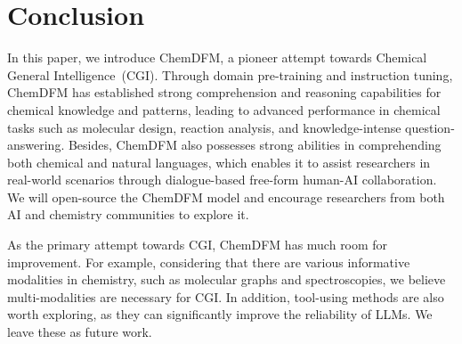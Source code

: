 \section{Conclusion}

In this paper, we introduce ChemDFM, a pioneer attempt towards Chemical General Intelligence~(CGI). Through domain pre-training and instruction tuning, ChemDFM has established strong comprehension and reasoning capabilities for chemical knowledge and patterns, leading to advanced performance in chemical tasks such as molecular design, reaction analysis, and knowledge-intense question-answering. Besides, ChemDFM also possesses strong abilities in comprehending both chemical and natural languages, which enables it to assist researchers in real-world scenarios through dialogue-based free-form human-AI collaboration. We will open-source the ChemDFM model and encourage researchers from both AI and chemistry communities to explore it.

As the primary attempt towards CGI, ChemDFM has much room for improvement. For example, considering that there are various informative modalities in chemistry, such as molecular graphs and spectroscopies, we believe multi-modalities are necessary for CGI. In addition, tool-using methods are also worth exploring, as they can significantly improve the reliability of LLMs. We leave these as future work.

